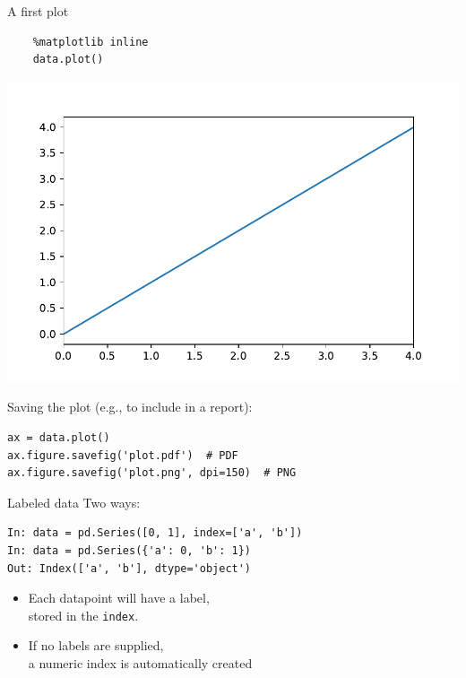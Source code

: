 \documentclass[aspectratio=169,usenames,dvipsnames]{beamer}
\begin{document}
\begin{frame}[fragile]{A first plot}
    \begin{lstlisting}
    %matplotlib inline
    data.plot()
    \end{lstlisting}
    \includegraphics[height=0.5\textheight]{fig/basicplot}
    \pause

Saving the plot (e.g., to include in a report):
\begin{lstlisting}
ax = data.plot()
ax.figure.savefig('plot.pdf')  # PDF
ax.figure.savefig('plot.png', dpi=150)  # PNG
\end{lstlisting}
\end{frame}

\begin{frame}[fragile]{Labeled data}
Two ways:
\begin{lstlisting}
In: data = pd.Series([0, 1], index=['a', 'b'])
In: data = pd.Series({'a': 0, 'b': 1})
Out: Index(['a', 'b'], dtype='object')
\end{lstlisting}

\begin{itemize}
    \item Each datapoint will have a label, \\
        stored in the \texttt{index}.
    \item If no labels are supplied, \\
        a numeric index is automatically created
\end{itemize}
\end{frame}
\end{document}

